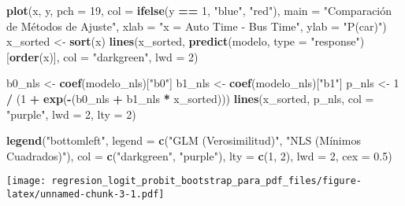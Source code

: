 \documentclass[
]{article}
\newenvironment{Shaded}{\begin{snugshade}}{\end{snugshade}}
\newcommand{\AttributeTok}[1]{\textcolor[rgb]{0.13,0.29,0.53}{#1}}
\newcommand{\DecValTok}[1]{\textcolor[rgb]{0.00,0.00,0.81}{#1}}
\newcommand{\FloatTok}[1]{\textcolor[rgb]{0.00,0.00,0.81}{#1}}
\newcommand{\FunctionTok}[1]{\textcolor[rgb]{0.13,0.29,0.53}{\textbf{#1}}}
\newcommand{\NormalTok}[1]{#1}
\newcommand{\OtherTok}[1]{\textcolor[rgb]{0.56,0.35,0.01}{#1}}
\newcommand{\SpecialCharTok}[1]{\textcolor[rgb]{0.81,0.36,0.00}{\textbf{#1}}}
\newcommand{\StringTok}[1]{\textcolor[rgb]{0.31,0.60,0.02}{#1}}
\begin{document}
\begin{Shaded}
\begin{Highlighting}[]
\FunctionTok{plot}\NormalTok{(x, y, }\AttributeTok{pch =} \DecValTok{19}\NormalTok{, }\AttributeTok{col =} \FunctionTok{ifelse}\NormalTok{(y }\SpecialCharTok{==} \DecValTok{1}\NormalTok{, }\StringTok{"blue"}\NormalTok{, }\StringTok{"red"}\NormalTok{),}
     \AttributeTok{main =} \StringTok{"Comparación de Métodos de Ajuste"}\NormalTok{, }\AttributeTok{xlab =} \StringTok{"x = Auto Time {-} Bus Time"}\NormalTok{, }\AttributeTok{ylab =} \StringTok{"P(car)"}\NormalTok{)}
\NormalTok{x\_sorted }\OtherTok{\textless{}{-}} \FunctionTok{sort}\NormalTok{(x)}
\FunctionTok{lines}\NormalTok{(x\_sorted, }\FunctionTok{predict}\NormalTok{(modelo, }\AttributeTok{type =} \StringTok{"response"}\NormalTok{)[}\FunctionTok{order}\NormalTok{(x)], }\AttributeTok{col =} \StringTok{"darkgreen"}\NormalTok{, }\AttributeTok{lwd =} \DecValTok{2}\NormalTok{)}

\NormalTok{b0\_nls }\OtherTok{\textless{}{-}} \FunctionTok{coef}\NormalTok{(modelo\_nls)[}\StringTok{"b0"}\NormalTok{]}
\NormalTok{b1\_nls }\OtherTok{\textless{}{-}} \FunctionTok{coef}\NormalTok{(modelo\_nls)[}\StringTok{"b1"}\NormalTok{]}
\NormalTok{p\_nls }\OtherTok{\textless{}{-}} \DecValTok{1} \SpecialCharTok{/}\NormalTok{ (}\DecValTok{1} \SpecialCharTok{+} \FunctionTok{exp}\NormalTok{(}\SpecialCharTok{{-}}\NormalTok{(b0\_nls }\SpecialCharTok{+}\NormalTok{ b1\_nls }\SpecialCharTok{*}\NormalTok{ x\_sorted)))}
\FunctionTok{lines}\NormalTok{(x\_sorted, p\_nls, }\AttributeTok{col =} \StringTok{"purple"}\NormalTok{, }\AttributeTok{lwd =} \DecValTok{2}\NormalTok{, }\AttributeTok{lty =} \DecValTok{2}\NormalTok{)}

\FunctionTok{legend}\NormalTok{(}\StringTok{"bottomleft"}\NormalTok{, }\AttributeTok{legend =} \FunctionTok{c}\NormalTok{(}\StringTok{"GLM (Verosimilitud)"}\NormalTok{, }\StringTok{"NLS (Mínimos Cuadrados)"}\NormalTok{),}
       \AttributeTok{col =} \FunctionTok{c}\NormalTok{(}\StringTok{"darkgreen"}\NormalTok{, }\StringTok{"purple"}\NormalTok{), }\AttributeTok{lty =} \FunctionTok{c}\NormalTok{(}\DecValTok{1}\NormalTok{, }\DecValTok{2}\NormalTok{), }\AttributeTok{lwd =} \DecValTok{2}\NormalTok{, }\AttributeTok{cex =} \FloatTok{0.5}\NormalTok{)}
\end{Highlighting}
\end{Shaded}

\texttt{[image: regresion\_logit\_probit\_bootstrap\_para\_pdf\_files/figure-latex/unnamed-chunk-3-1.pdf]}
\end{document}
